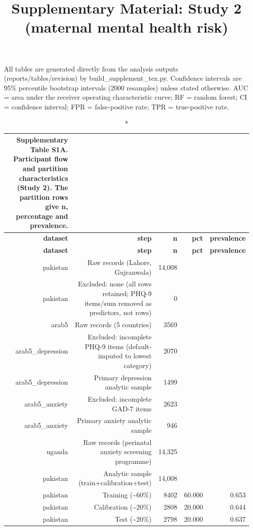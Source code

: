 \documentclass[10pt]{article}
\begin{document}
\title{Supplementary Material: Study 2 (maternal mental health risk)}
\author{}\date{}
\maketitle
\noindent All tables are generated directly from the analysis outputs (reports/tables/revision) by build\_supplement\_tex.py.
Confidence intervals are 95\% percentile bootstrap intervals (2000 resamples) unless stated otherwise. AUC = area under the receiver operating characteristic curve;
RF = random forest; CI = confidence interval; FPR = false-positive rate; TPR = true-positive rate.

\tiny
\setlength{\tabcolsep}{2pt}
\begin{longtable}{rrrrr}
\caption*{\textbf{Supplementary Table S1A.} Participant flow and partition characteristics (Study 2). The partition rows give n, percentage and prevalence.}\\
\toprule
\textbf{dataset} & \textbf{step} & \textbf{n} & \textbf{pct} & \textbf{prevalence} \\
\midrule
\endfirsthead
\toprule
\textbf{dataset} & \textbf{step} & \textbf{n} & \textbf{pct} & \textbf{prevalence} \\
\midrule
\endhead
\bottomrule
\endfoot
pakistan & Raw records (Lahore, Gujranwala) & 14{,}008 &  &  \\
pakistan & Excluded: none (all rows retained; PHQ-9 items/sum removed as predictors, not rows) & 0 &  &  \\
arab5 & Raw records (5 countries) & 3569 &  &  \\
arab5\_depression & Excluded: incomplete PHQ-9 items (default-imputed to lowest category) & 2070 &  &  \\
arab5\_depression & Primary depression analytic sample & 1499 &  &  \\
arab5\_anxiety & Excluded: incomplete GAD-7 items & 2623 &  &  \\
arab5\_anxiety & Primary anxiety analytic sample & 946 &  &  \\
uganda & Raw records (perinatal anxiety screening programme) & 14{,}325 &  &  \\
pakistan & Analytic sample (train+calibration+test) & 14{,}008 &  &  \\
pakistan & Training (\textasciitilde{}60\%) & 8402 & 60.000 & 0.653 \\
pakistan & Calibration (\textasciitilde{}20\%) & 2808 & 20.000 & 0.644 \\
pakistan & Test (\textasciitilde{}20\%) & 2798 & 20.000 & 0.637 \\

\end{longtable}
\end{document}
